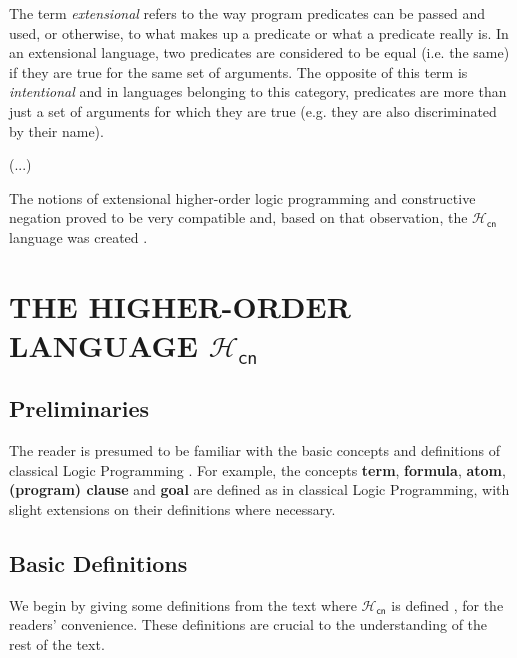 \documentclass[inscr,ack,preface]{dithesis}
\theoremstyle{definition}
\newcommand{\hcn}{$\mathcal{H}_\mathsf{cn}$}
\begin{document}
The term \emph{extensional} refers to the way program predicates can be passed and used, or otherwise, to what makes up a predicate or what a predicate really is. In an extensional language, two predicates are considered to be equal (i.e. the same) if they are true for the same set of arguments. The opposite of this term is \emph{intentional} and in languages belonging to this category, predicates are more than just a set of arguments for which they are true (e.g. they are also discriminated by their name).

(...)

The notions of extensional higher-order logic programming and constructive negation proved to be very compatible and, based on that observation, the \hcn{} language was created \cite{DBLP:conf/kr/CharalambidisR14}.

\chapter{THE HIGHER-ORDER LANGUAGE \hcn}
\label{chap:hcn}

\section{Preliminaries}
The reader is presumed to be familiar with the basic concepts and definitions of classical Logic Programming \cite{Lloyd:1987:FLP:39279}. For example, the concepts \textbf{term}, \textbf{formula}, \textbf{atom}, \textbf{(program) clause} and \textbf{goal} are defined as in classical Logic Programming, with slight extensions on their definitions where necessary.

\section{Basic Definitions}
We begin by giving some definitions from the text where \hcn{} is defined \cite{DBLP:conf/kr/CharalambidisR14}, for the readers' convenience. These definitions are crucial to the understanding of the rest of the text.
\end{document}
